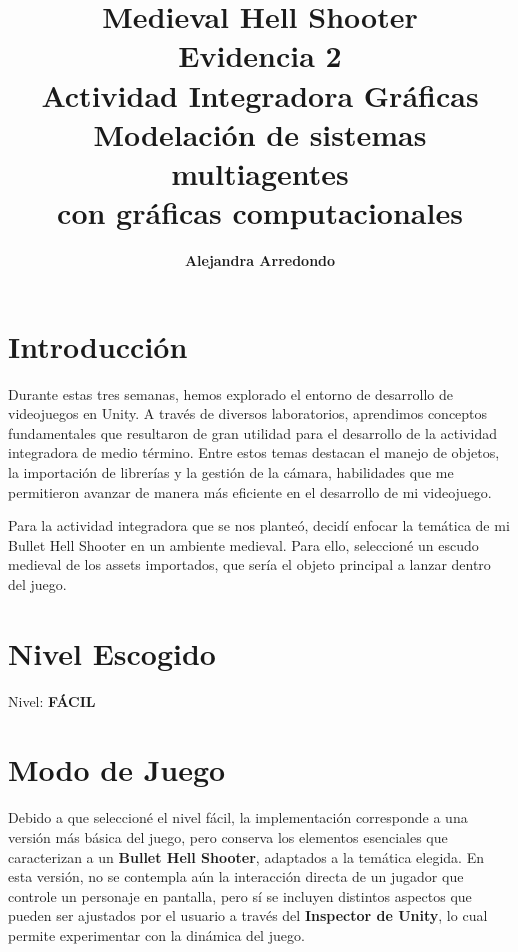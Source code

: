 \documentclass[11pt]{article}
\title{
  \fontsize{80}{80}\selectfont \textbf{Medieval Hell Shooter}\\[1em]
  \large \textbf{Evidencia 2}\\Actividad Integradora Gráficas\\[1.5em]
  \large Modelación de sistemas multiagentes\\ con gráficas computacionales\\[1.5em]
}
\author{\textbf{Alejandra Arredondo}}
\begin{document}
\maketitle
\thispagestyle{empty}  %

\newpage                %
\pagestyle{plain}       %

\section*{Introducción}
Durante estas tres semanas, hemos explorado el entorno de desarrollo de videojuegos en Unity. A través de diversos laboratorios, aprendimos conceptos fundamentales que resultaron de gran utilidad para el desarrollo de la actividad integradora de medio término. Entre estos temas destacan el manejo de objetos, la importación de librerías y la gestión de la cámara, habilidades que me permitieron avanzar de manera más eficiente en el desarrollo de mi videojuego.

\vspace{0.5cm} 

Para la actividad integradora que se nos planteó, decidí enfocar la temática de mi Bullet Hell Shooter en un ambiente medieval. Para ello, seleccioné un escudo medieval de los assets importados, que sería el objeto principal a lanzar dentro del juego.

\section*{Nivel Escogido}

Nivel: \textbf{FÁCIL}

\section*{Modo de Juego}

Debido a que seleccioné el nivel fácil, la implementación corresponde a una versión más básica del juego, pero conserva los elementos esenciales que caracterizan a un \textbf{Bullet Hell Shooter}, adaptados a la temática elegida. En esta versión, no se contempla aún la interacción directa de un jugador que controle un personaje en pantalla, pero sí se incluyen distintos aspectos que pueden ser ajustados por el usuario a través del \textbf{Inspector de Unity}, lo cual permite experimentar con la dinámica del juego.
\end{document}
